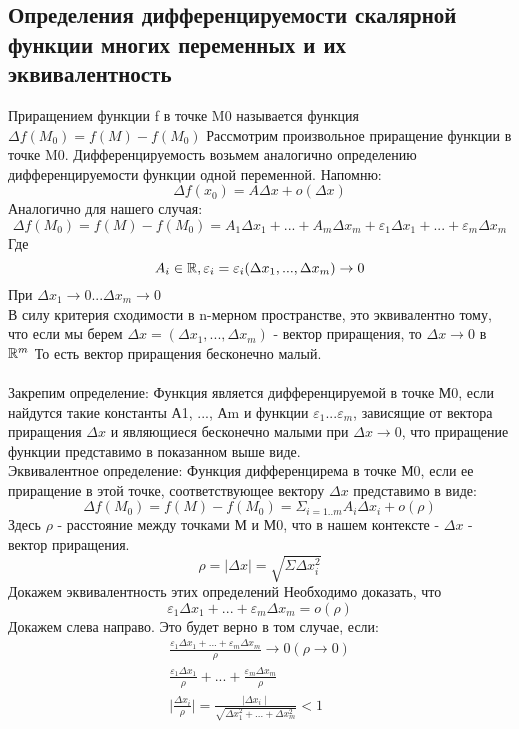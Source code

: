 \subsection{Определения дифференцируемости скалярной функции многих переменных и их эквивалентность}
Приращением функции f в точке M0 называется функция $\Delta f(M_0) = f(M) - f(M_0)$
Рассмотрим произвольное приращение функции в точке M0. 
Дифференцируемость возьмем аналогично определению дифференцируемости функции одной переменной. Напомню:
$$
\Delta f(x_0) = A \Delta x + o(\Delta x)
$$
Аналогично для нашего случая:
$$
\Delta f(M_0) = f(M) - f(M_0) = A_1\Delta x_1 + ... + A_m\Delta x_m + \varepsilon_1 \Delta x_1 + ... + \varepsilon_m \Delta x_m
$$
Где 
$$
A_i \in \mathbb{R}, \varepsilon_i = \varepsilon_i(\Delta x_1, ..., \Delta x_m) \rightarrow 0
$$
При $\Delta x_1 \rightarrow 0 ... \Delta x_m \rightarrow 0$
\\
В силу критерия сходимости в n-мерном пространстве, это эквивалентно тому, что если мы берем $\Delta x = (\Delta x_1, ..., \Delta x_m)$ - вектор приращения, то $\Delta x \rightarrow 0$ в $\mathbb{R}^m$
То есть вектор приращения бесконечно малый.
\\
\\
Закрепим определение:
Функция является дифференцируемой в точке М0, если найдутся такие константы А1, ..., Аm и функции $\varepsilon_1 ... \varepsilon_m$, зависящие от вектора приращения $\Delta x$ и являющиеся бесконечно малыми при $\Delta x \rightarrow 0$, что приращение функции представимо в показанном выше виде.
\\
Эквивалентное определение:
Функция дифференцирема в точке М0, если ее приращение в этой точке, соответствующее вектору $\Delta x$ представимо в виде:
$$
\Delta f(M_0) = f(M) - f(M_0) = \Sigma_{i = 1 .. m} A_i \Delta x_i + o(\rho)
$$
Здесь $\rho$ - расстояние между точками М  и М0, что в нашем контексте - $\Delta x$ - вектор приращения.
$$
\rho = |\Delta x| = \sqrt{\Sigma{\Delta x_i^2}}
$$
Докажем эквивалентность этих определений
Необходимо доказать, что
$$
\varepsilon_1 \Delta x_1 + ... + \varepsilon_m \Delta x_m = o(\rho)
$$
Докажем слева направо. Это будет верно в том случае, если:
\begin{gather*}
\frac{\varepsilon_1 \Delta x_1 + ... + \varepsilon_m \Delta x_m}{\rho} \rightarrow 0 (\rho \rightarrow 0)
\\
\frac{\varepsilon_1 \Delta x_1}{\rho} + ... + \frac{\varepsilon_m \Delta x_m}{\rho}
\\
\mid\frac{\Delta x_i}{\rho}\mid = \frac{\mid\Delta x_i \mid}{\sqrt{\Delta x_1^2 + ... + \Delta x_m^2}} < 1
\end{gather*}
